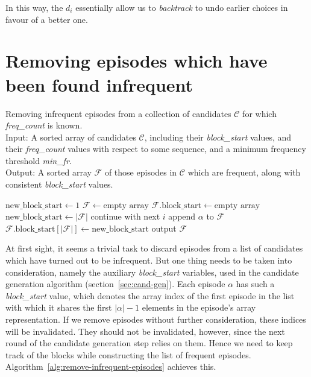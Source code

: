 In this way, the $ d_i $ essentially allow us to \emph{backtrack} to undo earlier choices in favour of a better one.



\section{Removing episodes which have been found infrequent}
\label{sec:maintain-blocks}

\begin{algorithm}

\caption{Removing infrequent episodes from a collection of candidates $ \mathcal{C} $ for which \emph{freq\_count} is known. \\
Input: A sorted array of candidates $ \mathcal{C} $, including their \emph{block\_start} values, and their \emph{freq\_count} values with respect to some sequence, and a minimum frequency threshold \emph{min\_fr}. \\
Output: A sorted array $ \mathcal{F} $ of those episodes in $ \mathcal{C} $ which are frequent, along with consistent \emph{block\_start} values.
}

\begin{algorithmic}[1]

\State $ \text{new\_block\_start} \gets 1 $
\State $ \mathcal{F} \gets \text{empty array} $
\State $ \mathcal{F} \text{.block\_start} \gets \text{empty array} $
     \label{alglin:remove-infrequent-episodes:different-block-test}
        \State $ \text{new\_block\_start} \gets | \mathcal{F} | $
    \EndIf
        \State continue with next $ i $
    \EndIf
    \State append $ \alpha $ to $ \mathcal{F} $
    \State $ \mathcal{F} \text{.block\_start}[ | \mathcal{F} | ] \gets \text{new\_block\_start} $
\EndFor
\State output $ \mathcal{F} $

\end{algorithmic}

\label{alg:remove-infrequent-episodes}
\end{algorithm}

At first sight, it seems a trivial task to discard episodes from a list of candidates which have turned out to be infrequent. But one thing needs to be taken into consideration, namely the auxiliary \emph{block\_start} variables, used in the candidate generation algorithm (section~\ref{sec:cand-gen}). Each episode $ \alpha $ has such a \emph{block\_start} value, which denotes the array index of the first episode in the list with which it shares the first $ | \alpha | - 1 $ elements in the episode's array representation. If we remove episodes without further consideration, these indices will be invalidated. They should not be invalidated, however, since the next round of the candidate generation step relies on them. Hence we need to keep track of the blocks while constructing the list of frequent episodes. Algorithm~\ref{alg:remove-infrequent-episodes} achieves this.

